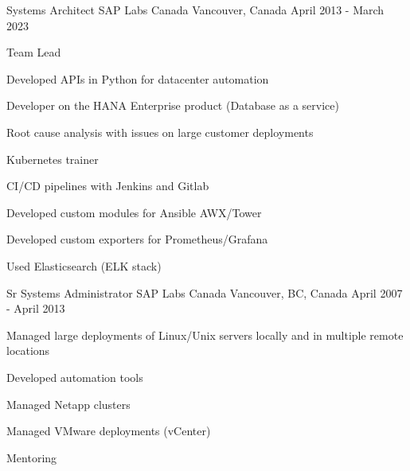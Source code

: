 

\begin{cventries}

  \cventry
    {Systems Architect} %
    {SAP Labs Canada} %
    {Vancouver, Canada} %
    {April 2013 - March 2023} %
    {
      \begin{cvitems} %
        \item {Team Lead}
        \item {Developed APIs in Python for datacenter automation}
        \item {Developer on the HANA Enterprise product (Database as a service)}
        \item {Root cause analysis with issues on large customer deployments}
        \item {Kubernetes trainer}
        \item {CI/CD pipelines with Jenkins and Gitlab}
        \item {Developed custom modules for Ansible AWX/Tower}
        \item {Developed custom exporters for Prometheus/Grafana}
        \item {Used Elasticsearch (ELK stack)}
      \end{cvitems}
    }

  \cventry
    {Sr Systems Administrator} %
    {SAP Labs Canada} %
    {Vancouver, BC, Canada} %
    {April 2007 - April 2013} %
    {
      \begin{cvitems} %
        \item {Managed large deployments of Linux/Unix servers locally and in multiple remote locations}
        \item {Developed automation tools}
        \item {Managed Netapp clusters}
        \item {Managed VMware deployments (vCenter)}
        \item {Mentoring}
      \end{cvitems}
    }


\end{cventries}
